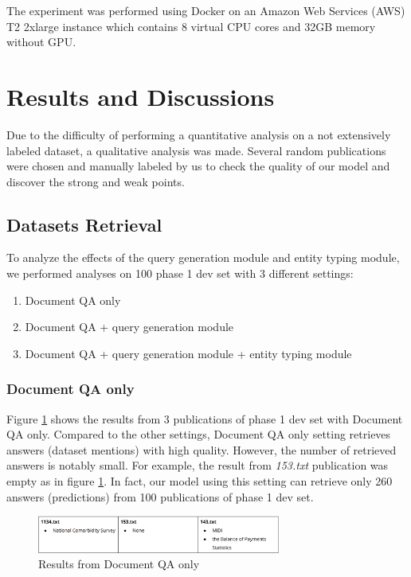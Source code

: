 \documentclass[11pt]{article}
\begin{document}
The experiment was performed using Docker\cite{anderson2015docker} on an Amazon Web Services (AWS) T2 2xlarge instance which contains 8 virtual CPU cores and 32GB memory without GPU. 

\section{Results and Discussions}
Due to the difficulty of performing a quantitative analysis on a not extensively labeled dataset, a qualitative analysis was made. Several random publications were chosen and manually labeled by us to check the quality of our model and discover the strong and weak points.

\subsection{Datasets Retrieval}
To analyze the effects of the query generation module and entity typing module, we performed analyses on 100 phase 1 dev set with 3 different settings:
\begin{enumerate}
    \item Document QA only
    \item Document QA + query generation module
    \item Document QA + query generation module + entity typing module
\end{enumerate}

\subsubsection{Document QA only}
Figure \ref{fig:docqaonly} shows the results from 3 publications of phase 1 dev set with Document QA only. Compared to the other settings, Document QA only setting retrieves answers (dataset mentions) with high quality. However, the number of  retrieved answers is notably small. For example, the result from \textit{153.txt} publication was empty as in figure \ref{fig:docqaonly}. In fact, our model using this setting can retrieve only 260 answers (predictions) from 100 publications of phase 1 dev set.

\begin{figure}[!htb]
    \centering
    \includegraphics[width = 8cm]{phase1.png}
    \caption{Results from Document QA only}
    \label{fig:docqaonly}
\end{figure}
\end{document}
